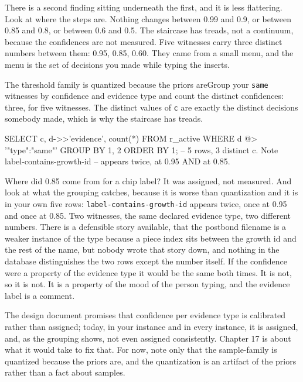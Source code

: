 There is a second finding sitting underneath the first, and it is less flattering. Look at where the steps are. Nothing changes between 0.99 and 0.9, or between 0.85 and 0.8, or between 0.6 and 0.5. The staircase has treads, not a continuum, because the confidences are not measured. Five witnesses carry three distinct numbers between them: 0.95, 0.85, 0.60. They came from a small menu, and the menu is the set of decisions you made while typing the inserts.

\begin{Correspondence}{The threshold family is quantized because the priors are}{Group your \texttt{same} witnesses by confidence and evidence type and count the distinct confidences: three, for five witnesses.}
The distinct values of \texttt{c} are exactly the distinct decisions somebody made, which is why the staircase has treads.
\begin{Check}
SELECT c, d->>'evidence', count(*)
  FROM r_active
 WHERE d @> '{"type":"same"}'
 GROUP BY 1, 2
 ORDER BY 1;      -- 5 rows, 3 distinct c. Note label-contains-growth-id
                  -- appears twice, at 0.95 AND at 0.85.
\end{Check}
Where did 0.85 come from for a chip label? It was assigned, not measured. And look at what the grouping catches, because it is worse than quantization and it is in your own five rows: \texttt{label-contains-growth-id} appears twice, once at 0.95 and once at 0.85. Two witnesses, the same declared evidence type, two different numbers. There is a defensible story available, that the postbond filename is a weaker instance of the type because a piece index sits between the growth id and the rest of the name, but nobody wrote that story down, and nothing in the database distinguishes the two rows except the number itself. If the confidence were a property of the evidence type it would be the same both times. It is not, so it is not. It is a property of the mood of the person typing, and the evidence label is a comment.

The design document promises that confidence per evidence type is calibrated rather than assigned; today, in your instance and in every instance, it is assigned, and, as the grouping shows, not even assigned consistently. Chapter 17 is about what it would take to fix that. For now, note only that the sample-family is quantized because the priors are, and the quantization is an artifact of the priors rather than a fact about samples.
\end{Correspondence}

